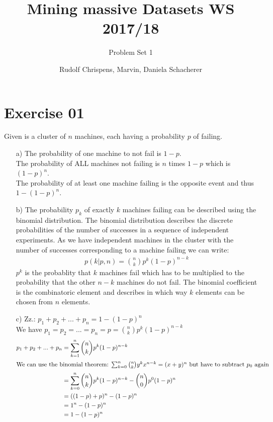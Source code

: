 \documentclass[11pt,a4paper]{scrartcl}
\title{Mining massive Datasets WS 2017/18}
\subtitle{Problem Set 1}
\author{Rudolf Chrispens, Marvin, Daniela Schacherer}
\begin{document}
\maketitle

	\section*{Exercise 01}
	Given is a cluster of $n$ machines, each having a probability $p$ of failing. 
	\begin{itemize}
		\item[a)] The probability of one machine to not fail is $1-p$. \\
		The probability of ALL machines not failing is $n$ times $1-p$ which is $(1-p)^n$. \\
		The probability of at least one machine failing is the opposite event and thus $1 - (1-p)^n$.
		\item[b)] The probability $p_k$ of exactly $k$ machines failing can be described using the binomial distribution. The binomial distribution describes the discrete probabilities of the number of successes in a sequence of independent experiments. As we have independent machines in the cluster with the number of successes corresponding to a machine failing we can write: \\
		\begin{align*}
			p(k|p,n) = {n\choose k} p^k (1-p)^{n-k}
		\end{align*}
		$p^k$ is the probablity that $k$ machines fail which has to be multiplied to the probability that the other $n-k$ machines do not fail. The binomial coefficient is the combinatoric element and describes in which way $k$ elements can be chosen from $n$ elements. 
		\item[c)] 
		Zz.: $p_1 + p_2 + ... + p_n = 1 - (1-p)^n$ \\
		We have $p_1 = p_2 = ... = p_n = p = {n \choose k} p^k (1-p)^{n-k}$
		\begin{align*}
			p_1 + p_2 + ... + p_n &= \sum_{k=1}^n {n \choose k} p^k (1-p)^{n-k} \\
			\intertext{We can use the binomial theorem: $\sum_{k=0}^n {n\choose k} y^k x^{n-k} = (x+y)^n$ but have to subtract $p_0$ again}
			&=  \sum_{k=0}^n {n \choose k} p^k (1-p)^{n-k} - {n \choose 0} p^0 (1-p)^n \\
			&= ((1-p) + p)^n - (1-p)^n	\\		
			&= 1^n - (1-p)^ n \\
			&= 1-(1-p)^n			
		\end{align*}
	\end{itemize}
	
\end{document}
